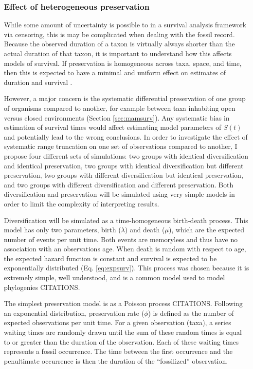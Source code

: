 \documentclass[12pt,letterpaper]{article}
\begin{document}
\subsubsection{Effect of heterogeneous preservation} \label{sec:survsim}
While some amount of uncertainty is possible to in a survival analysis framework via censoring, this is may be complicated when dealing with the fossil record. Because the observed duration of a taxon is virtually always shorter than the actual duration of that taxon, it is important to understand how this affects models of survival. If preservation is homogeneous across taxa, space, and time, then this is expected to have a minimal and uniform effect on estimates of duration and survival \citep{Sepkoski1975}.


However, a major concern is the systematic differential preservation of one group of organisms compared to another, for example between taxa inhabiting open versus closed environments (Section \ref{sec:mamsurv}). Any systematic bias in estimation of survival times would affect estimating model parameters of \(S(t)\) and potentially lead to the wrong conclusions. In order to investigate the effect of systematic range truncation on one set of observations compared to another, I propose four different sets of simulations: two groups with identical diversification and identical preservation, two groups with identical diversification but different preservation, two groups with different diversification but identical preservation, and two groups with different diversification and different preservation. Both diversification and preservation will be simulated using very simple models in order to limit the complexity of interpreting results. 

Diversification will be simulated as a time-homogeneous birth-death process. This model has only two parameters, birth (\(\lambda\)) and death (\(\mu\)), which are the expected number of events per unit time. Both events are memoryless and thus have no association with an observations age. When death is random with respect to age, the expected hazard function is constant and survival is expected to be exponentially distributed (Eq. \ref{eq:expsurv}). This process was chosen because it is extremely simple, well understood, and is a common model used to model phylogenies CITATIONS. 

The simplest preservation model is as a Poisson process CITATIONS. Following an exponential distribution, preservation rate (\(\phi\)) is defined as the number of expected observations per unit time. For a given observation (taxa), a series waiting times are randomly drawn until the sum of these random times is equal to or greater than the duration of the observation. Each of these waiting times represents a fossil occurrence. The time between the first occurrence and the penultimate occurrence is then the duration of the ``fossilized'' observation.
\end{document}
